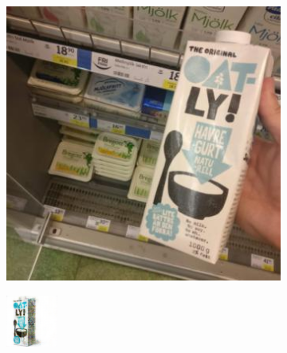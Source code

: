 \begin{figure}[t]
\begin{subfigure}[b]{0.14\textwidth}
		\caption{}
		\label{subfig:brown-cap-decoded}
	\end{subfigure} %
	\begin{subfigure}[b]{0.14\textwidth}
		\centering
		\includegraphics[width=\textwidth]{PaperA/decoded-image-figure/Oatly-Natural-Yoghurt_007.jpg}
		\caption{}
		\label{subfig:oatgurt-natural}
	\end{subfigure} %
	\begin{subfigure}[b]{0.14\textwidth}
		\centering
		\includegraphics[width=\textwidth]{PaperA/decoded-image-figure/densenet_nov11/Oatly-Natural-Yoghurt_decoded.png}

\end{subfigure}
\end{figure}
